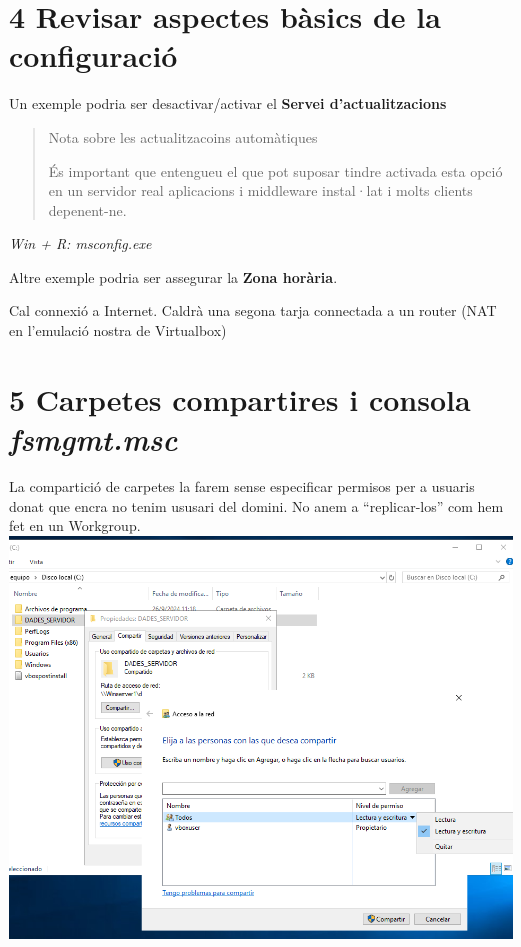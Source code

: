 \documentclass[
  a4paper,
]{article}
\begin{document}
\section{4 Revisar aspectes bàsics de la
configuració}\label{revisar-aspectes-buxe0sics-de-la-configuraciuxf3}

Un exemple podria ser desactivar/activar el \textbf{Servei
d'actualitzacions}

\begin{quote}
Nota sobre les actualitzacoins automàtiques

És important que entengueu el que pot suposar tindre activada esta opció
en un servidor real aplicacions i middleware instal·lat i molts clients
depenent-ne.
\end{quote}

\emph{Win + R: msconfig.exe}

Altre exemple podria ser assegurar la \textbf{Zona horària}.

Cal connexió a Internet. Caldrà una segona tarja connectada a un router
(NAT en l'emulació nostra de Virtualbox)

\section{\texorpdfstring{5 Carpetes compartires i consola
\emph{fsmgmt.msc}}{5 Carpetes compartires i consola fsmgmt.msc}}\label{carpetes-compartires-i-consola-fsmgmt.msc}

La compartició de carpetes la farem sense especificar permisos per a
usuaris donat que encra no tenim ususari del domini. No anem a
``replicar-los'' com hem fet en un Workgroup.
\includegraphics{png/ADDS/Compartir.png}
\end{document}
